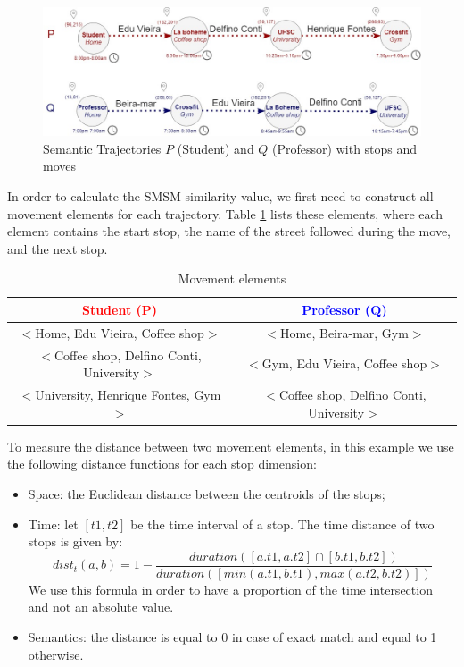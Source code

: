 \documentclass[12pt]{article}
\begin{document}
\begin{figure}[h!]
\centering
\includegraphics[width=1\textwidth]{Images/running_example.jpg}
\caption{\label{fig:bus} Semantic Trajectories $P$ (Student) and $Q$ (Professor) with stops and moves}
\end{figure}


In order to calculate the SMSM similarity value, we first need to construct all movement elements for each trajectory. Table \ref{tab:SMSM_tuples} lists these elements, where each element contains the start stop, the name of the street followed during the move, and the next stop. 

\begin{table}[h!]
\scriptsize
  \centering
  \begin{tabular}{|c|c|}
  	\hline
		\textcolor{Red}{\textbf{Student (P)}} & \textcolor{Blue}{\textbf{Professor (Q)}}\\
  	\hline
      $<$Home, Edu Vieira, Coffee shop$>$&$<$Home, Beira-mar, Gym$>$\\
      $<$Coffee shop, Delfino Conti, University$>$&$<$Gym, Edu Vieira, Coffee shop$>$\\
      $<$University, Henrique Fontes, Gym$>$&$<$Coffee shop, Delfino Conti, University$>$\\
  	\hline
  \end{tabular}
  \label{tab:wrong}
  \caption{Movement elements}
  \label{tab:SMSM_tuples}
\end{table}

To measure the distance between two movement elements, in this example we use the following distance functions for each stop dimension:
\begin{itemize}
  \item Space: the Euclidean distance between the centroids of the stops;
      \item  Time:  {let $[t1, t2]$ be the time interval of a stop. The time distance of two stops is given by:}
\begin{equation} \label{func:time_interval}
	dist_t(a, b) = 1 - \dfrac{duration([a.t1, a.t2] \cap [b.t1, b.t2])}{duration([min(a.t1, b.t1), max(a.t2, b.t2)])}
\end{equation}
{We use this formula in order to have a proportion of the time intersection and not an absolute value.}
  \item Semantics: the distance is equal to 0 in case of exact match and equal to 1 otherwise.
\end{itemize}
\end{document}
